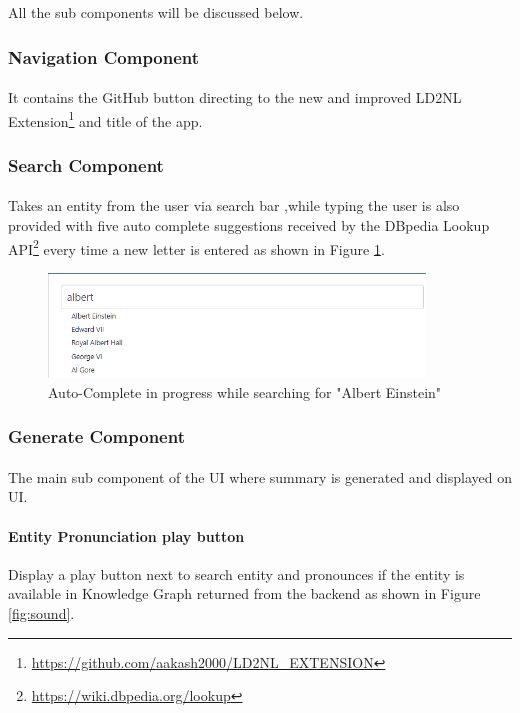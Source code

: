 \documentclass[head,11pt]{llncs}
\begin{document}
All the sub components will be discussed below.



\subsubsection{Navigation Component}
\paragraph{}
It contains the GitHub button directing to the new and improved LD2NL Extension\footnote{\url{https://github.com/aakash2000/LD2NL_EXTENSION}} and title of the app.

\subsubsection{Search Component}
\paragraph{}
Takes an entity from the user via search bar ,while typing the user is also provided with five auto complete suggestions received by the DBpedia Lookup API\footnote{\url{https://wiki.dbpedia.org/lookup}} every time a new letter is entered as shown in Figure \ref{fig:auto}.

\begin{figure}[h!]
\centering
\includegraphics[width=100mm]{figures/auto.png}
\caption{Auto-Complete in progress while searching for "Albert Einstein"}
\label{fig:auto}
\end{figure}


\subsubsection{Generate Component}
\paragraph{}
The main sub component of the UI where summary is generated and displayed on UI.

\paragraph{\textbf{Entity Pronunciation play button}}
Display a play button next to search entity and pronounces if the entity is available in Knowledge Graph returned from the backend as shown in Figure \ref{fig:sound}.
\end{document}
